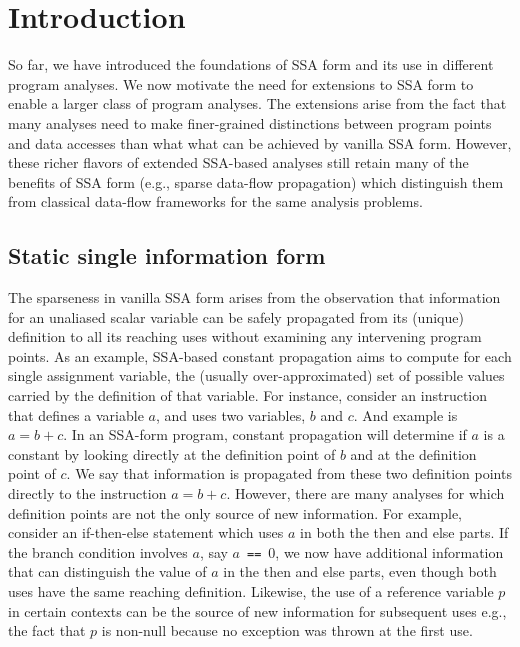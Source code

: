 \chapter{Introduction }


So far, we have introduced the foundations of SSA form and its use in different program analyses. 
We now motivate the need for extensions to SSA form to enable a larger class of program analyses. 
The extensions arise from the fact that many analyses need to make finer-grained distinctions between program points and data accesses than what what can be achieved by vanilla SSA form. 
However, these richer flavors of extended SSA-based analyses still retain many of the benefits of SSA form (e.g., sparse data-flow propagation) which distinguish them from classical data-flow frameworks for the same analysis problems.


\section{Static single information form}
The sparseness in vanilla SSA form arises from the observation that information for an unaliased scalar variable can be safely propagated from its (unique) definition to all its reaching uses without examining any intervening program points. 
As an example, SSA-based constant propagation aims to compute for each single assignment variable, the (usually over-approximated) set of possible values carried by the definition of that variable. 
For instance, consider an instruction that defines a variable $a$, and uses two variables, $b$ and $c$. 
And example is $a = b + c$. 
In an SSA-form program, constant propagation will determine if $a$ is a constant by looking directly at the definition point of $b$ and at the definition point of $c$. 
We say that information is propagated from these two definition points directly to the instruction $a = b + c$.
However, there are many analyses for which definition points are not the only source of new information. 
For example, consider an if-then-else statement which uses $a$ in both the then and else parts. 
If the branch condition involves $a$, say $a$~{\tt ==}~0, we now have additional information that can distinguish the value of $a$ in the then and else parts, even though both uses have the same reaching definition. 
Likewise, the use of a reference variable $p$ in certain contexts can be the source of new information for subsequent uses e.g., the fact that $p$ is non-null because no exception was thrown at the first use.

